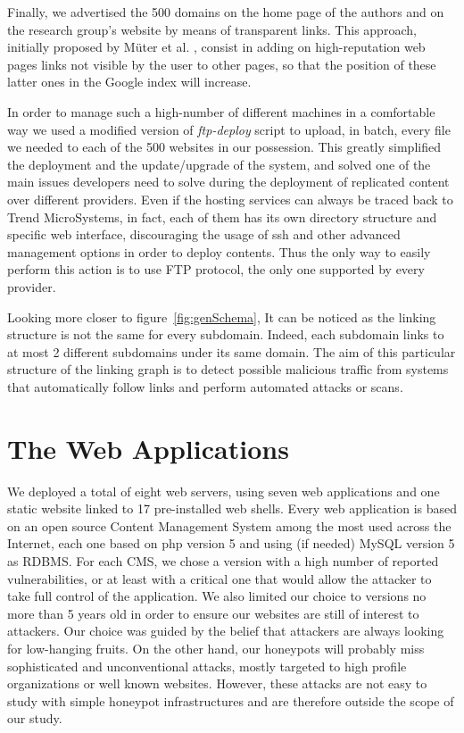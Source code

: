 Finally, we advertised the 500 domains on the home page of the authors and on the research group's website by means of transparent links. This approach, initially proposed by M\"uter et al. \cite{hihat}, consist in adding on high-reputation web pages links not visible by the user to other pages, so that the position of these latter ones in the Google index will increase.

In order to manage such a high-number of different machines in a comfortable way we used a modified version of \emph{ftp-deploy} script to upload, in batch, every file we needed to each of the 500 websites in our possession. This greatly simplified the deployment and the update/upgrade of the system, and solved one of the main issues developers need to solve during the deployment of replicated content over different providers. Even if the hosting services can always be traced back to Trend MicroSystems, in fact, each of them has its own directory structure and specific web interface, discouraging the usage of ssh and other advanced management options in order to deploy contents. Thus the only way to easily perform this action is to use FTP protocol, the only one supported by every provider.

Looking more closer to figure~\ref{fig:genSchema}, It can be noticed as the linking structure is not the same for every subdomain. Indeed, each subdomain links to at most 2 different subdomains under its same domain. The aim of this particular structure of the linking graph is to detect possible malicious traffic from systems that automatically follow links and perform automated attacks or scans.

\section{The Web Applications}
We deployed a total of eight web servers, using seven web applications and one static website linked to 17 pre-installed web shells. Every web application is based on an open source Content Management System among the most used across the Internet, each one based on php version 5 and using (if needed) MySQL version 5 as RDBMS. For each CMS, we chose a version with a high number of reported vulnerabilities, or at least with a critical one that would allow the attacker to take full control of the application. We also limited our choice to versions no more than 5 years old in order to ensure our websites are still of interest to attackers.
Our choice was guided by the belief that attackers are always looking for low-hanging fruits. On the other hand, our honeypots will probably miss sophisticated and unconventional attacks, mostly targeted to high profile organizations or well known websites. However, these attacks are not easy to study with simple honeypot infrastructures and are therefore outside the scope of our study.

